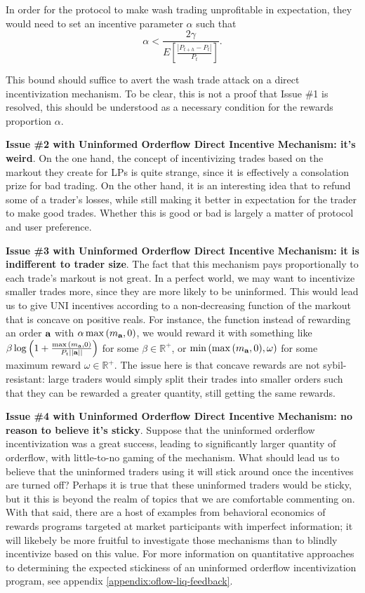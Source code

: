     In order for the protocol to make wash trading unprofitable in expectation, they would need to set an incentive parameter $\alpha$ such that
        \begin{equation}
            \alpha < \frac{2\gamma }{E \left[ \frac{|P_{t+h} - P_t|}{P_t} \right]}.
        \end{equation}
    
    This bound should suffice to avert the wash trade attack on a direct incentivization mechanism. To be clear, this is not a proof that Issue \#1 is resolved, this should be understood as a necessary condition for the rewards proportion $\alpha$.
    
    
    \textbf{Issue \#2 with Uninformed Orderflow Direct Incentive Mechanism: it's weird}.
    On the one hand, the concept of incentivizing trades based on the markout they create for LPs is quite strange, since it is effectively a consolation prize for bad trading. On the other hand, it is an interesting idea that to refund some of a trader's losses, while still making it better in expectation for the trader to make good trades. Whether this is good or bad is largely a matter of protocol and user preference.

    \textbf{Issue \#3 with Uninformed Orderflow Direct Incentive Mechanism: it is indifferent to trader size}.
    The fact that this mechanism pays proportionally to each trade's markout is not great. In a perfect world, we may want to incentivize smaller trades more, since they are more likely to be uninformed. This would lead us to give UNI incentives according to a non-decreasing function of the markout that is concave on positive reals. For instance, the function instead of rewarding an order $\textbf a$ with $\alpha \max{(m_{\textbf a}, 0)}$, we would reward it with something like $\beta \log \left(1 + \frac{\max{(m_{\textbf a}, 0)}}{P_t ||\textbf a||} \right)$ for some $\beta \in \mathbb R^+$, or $\min{ ( \max{(m_{\textbf a}, 0)}, \omega )}$ for some maximum reward $\omega \in \mathbb R^+$. The issue here is that concave rewards are not sybil-resistant: large traders would simply split their trades into smaller orders such that they can be rewarded a greater quantity, still getting the same rewards.
    
    \textbf{Issue \#4 with Uninformed Orderflow Direct Incentive Mechanism: no reason to believe it's sticky}.
    Suppose that the uninformed orderflow incentivization was a great success, leading to significantly larger quantity of orderflow, with little-to-no gaming of the mechanism. What should lead us to believe that the uninformed traders using it will stick around once the incentives are turned off? Perhaps it is true that these uninformed traders would be sticky, but it this is beyond the realm of topics that we are comfortable commenting on. With that said, there are a host of examples from behavioral economics of rewards programs targeted at market participants with imperfect information; it will likebely be more fruitful to investigate those mechanisms than to blindly incentivize based on this value. 
    For more information on quantitative approaches to determining the expected stickiness of an uninformed orderflow incentivization program, see appendix \ref{appendix:oflow-liq-feedback}.

